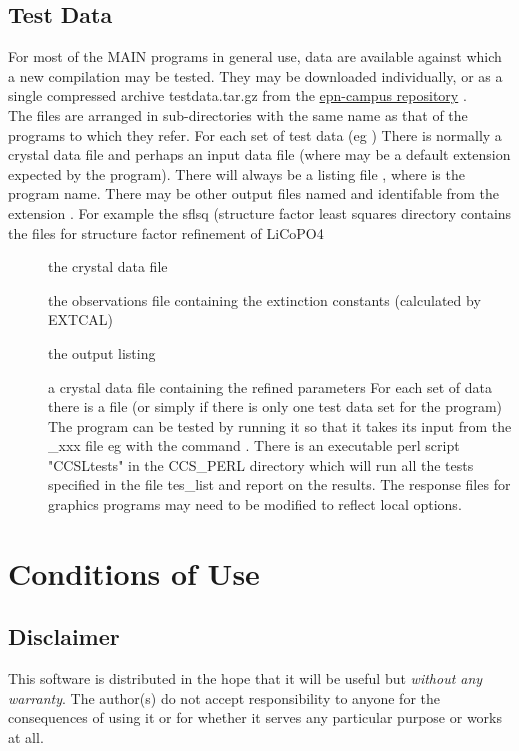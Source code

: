 \subsection{Test Data}
For most of the MAIN programs in general use, data are available against which
a new compilation may be tested. They  may be downloaded individually,  or as 
a single compressed archive testdata.tar.gz
from the \href{http://forge.epn-campus.eu/projects/sxtalsoft/repository/show/CCSL/testdata}
{epn-campus repository}
.\\ The files are arranged in
sub-directories with the same name as that of the programs to which they 
refer. For  each set of test data (eg ) There is normally a crystal
data file   and perhaps an input data file  (where
 may be a default extension expected by the program). There will
always be a listing file ,  where  is the
program name. There may be other output files named  and
identifable from the extension . For example the sflsq (structure
factor least squares directory contains the files for structure factor
refinement of LiCoPO4
\begin{description}
\item      [ ] the crystal data file 
\item      []  the observations file containing the extinction
                    constants (calculated by EXTCAL)
\item      [ ]        the output listing
\item      [ ]  a crystal data file containing the 
 refined parameters
For each set of data there is a file  (or simply  if
there is only one test data set for the program) The program can be
tested by running it so that it takes its input from the \_xxx file eg
with the command .
\p
There is an executable  perl script "CCSLtests" in the CCS\_PERL
directory which will run all the tests specified in the file tes\_list
and report on the results. The  response files for graphics
programs may need to be modified to reflect local options. \end{description}

\section{Conditions of Use}%
\subsection{Disclaimer}%
This software is distributed in the hope that it will be useful
but \emph{without any warranty}. The author(s) do not accept responsibility 
to anyone for the consequences of using it or for whether it serves 
any particular purpose or works at all.  
\\ 
